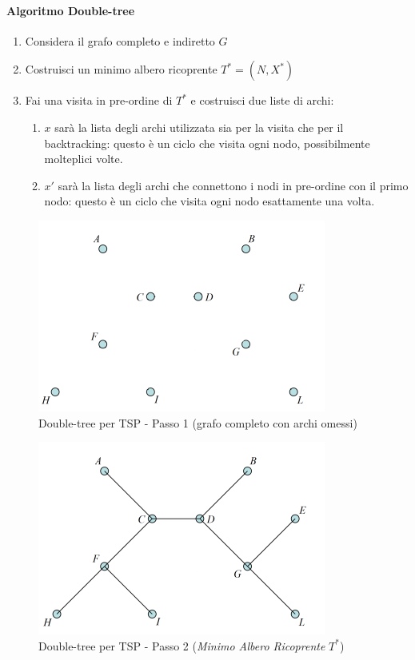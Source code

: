\documentclass{article}
\begin{document}
\paragraph{Algoritmo Double-tree}
\begin{enumerate}
    \item Considera il grafo completo e indiretto $G$
    \item Costruisci un minimo albero ricoprente $T^*=(N,X^*)$
    \item Fai una visita in pre-ordine di $T^*$ e costruisci due liste di archi:
          \begin{enumerate}
              \item $x$ sarà la lista degli archi utilizzata sia per la visita che per il backtracking:
                    questo è un ciclo che visita ogni nodo, possibilmente molteplici volte.
              \item $x'$ sarà la lista degli archi che connettono i nodi in pre-ordine con il primo nodo:
                    questo è un ciclo che visita ogni nodo esattamente una volta.
          \end{enumerate}
\end{enumerate}

\begin{figure}[H]
    \centering
    \includegraphics[scale=0.6]{images/TSP_double_tree_0.png}
    \caption{Double-tree per TSP - Passo 1 (grafo completo con archi omessi)}
\end{figure}

\begin{figure}[H]
    \centering
    \includegraphics[scale=0.6]{images/TSP_double_tree_1.png}
    \caption{Double-tree per TSP - Passo 2 (\textit{Minimo Albero Ricoprente} $T^*$)}
\end{figure}
\end{document}
